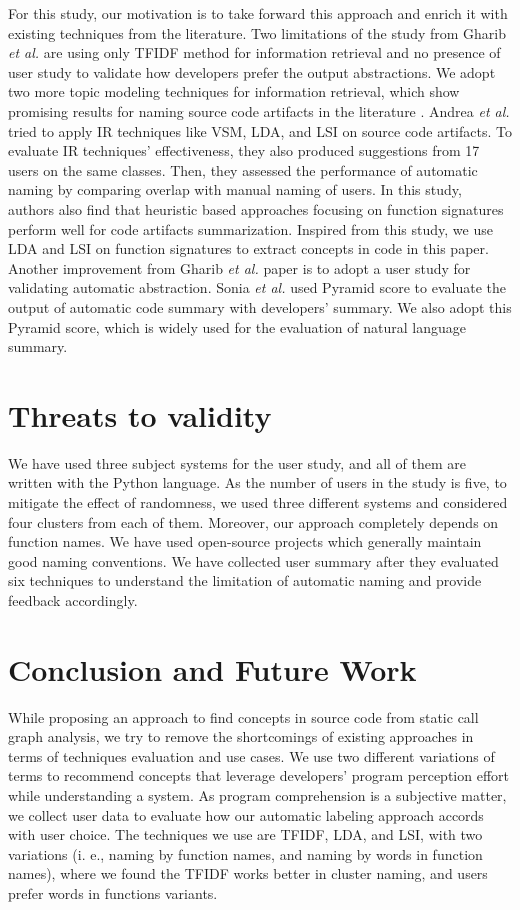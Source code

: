 For this study, our motivation is to take forward this approach and enrich it with existing techniques from the literature. Two limitations of the study from Gharib \textit{et al.}  are using only TFIDF method for information retrieval and no presence of user study to validate how developers prefer the output abstractions. We adopt two more topic modeling techniques for information retrieval, which show promising results for naming source code artifacts in the literature \cite{de2012using}. Andrea \textit{et al.}  \cite{de2012using} tried to apply IR techniques like VSM, LDA, and LSI on  source code artifacts. To evaluate IR techniques' effectiveness, they also produced suggestions from 17 users on the same classes. Then, they assessed the performance of automatic naming by comparing overlap
with manual naming of users. In this study, authors also find that heuristic based approaches focusing on function signatures perform well for code artifacts summarization. Inspired from this study, we use LDA and LSI on function signatures to extract concepts in code in this paper. Another improvement from Gharib \textit{et al.}  paper is to adopt a user study for validating automatic abstraction. Sonia \textit{et al.}  \cite{haiduc2010supporting} used Pyramid score to evaluate the output of automatic code summary with developers' summary. We also adopt this Pyramid score, which is widely used for the evaluation of natural language summary. 

\section{Threats to validity}
We have used three subject systems for the user study, and all of them are written with the Python language. As the number of users in the study is five, to mitigate the effect of randomness, we used three different systems and considered four clusters from each of them. Moreover, our approach completely depends on function names. We have used open-source projects which generally maintain good naming conventions.  We have collected user summary after they evaluated six techniques to understand the limitation of automatic naming and provide feedback accordingly.  
\section{Conclusion and Future Work}
\label{conclusion}
While proposing an approach to find concepts in source code from static call graph analysis, we try to remove the shortcomings of existing approaches in terms of techniques evaluation and use cases. We use two different variations of terms to recommend concepts that leverage developers' program perception effort while understanding a system. As program comprehension is a subjective matter, we collect user data to evaluate how our automatic labeling approach accords with user choice. The techniques we use are TFIDF, LDA, and LSI, with two variations (i. e., naming by function names, and naming by words in function names), where we found the TFIDF works better in cluster naming, and users prefer words in functions variants.   

